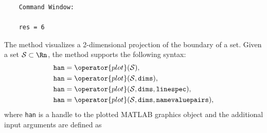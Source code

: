 \begin{center}
\begin{minipage}[t]{0.40\textwidth}
	\vspace{10pt}
	\footnotesize
	
\end{minipage}
\begin{minipage}[t]{0.2\textwidth}
	\vspace{10pt}

	\begin{verbatim}
	Command Window:
		
	res = 6
	\end{verbatim}
\end{minipage}
\begin{minipage}[t]{0.3\textwidth}
	\vspace{0pt}
	\centering
\end{minipage}
\end{center}


\label{sec:plot}

The method  visualizes a 2-dimensional projection of the boundary of a set. Given a set $\mathcal{S} \subset \Rn$, the method  supports the following syntax:
\begin{equation*}
	\begin{split}
		&\texttt{han} = \operator{plot}(\mathcal{S}), \\
		&\texttt{han} = \operator{plot}(\mathcal{S},\texttt{dims}), \\
		&\texttt{han} = \operator{plot}(\mathcal{S},\texttt{dims},\texttt{linespec}), \\
		&\texttt{han} = \operator{plot}(\mathcal{S},\texttt{dims},\texttt{namevaluepairs}), \\
	\end{split}
\end{equation*}
where \texttt{han} is a handle to the plotted MATLAB graphics object and the additional input arguments are defined as

